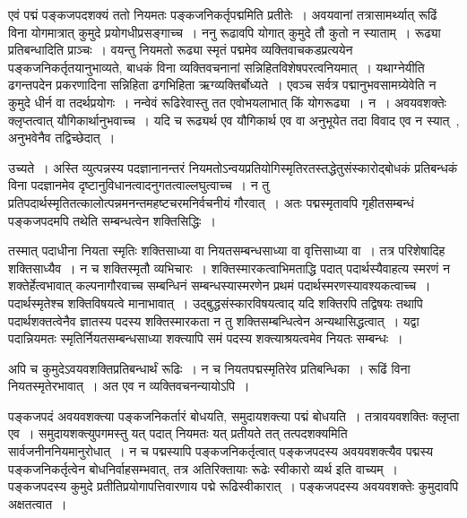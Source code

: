 			\begin{small}
			
				एवं पद्मं पङ्कजपदशक्यं ततो नियमतः पङ्कजनिकर्तृपद्ममिति प्रतीतेः~। अवयवानां तत्रासामर्थ्यात् रूढिं विना योगमात्रात् कुमुदे प्रयोगधीप्रसङ्गाच्च~। ननु रूढावपि योगात् कुमुदे तौ कुतो न स्याताम्~। रूढ्या प्रतिबन्धादिति प्राञ्चः~। वयन्तु नियमतो रूढ्या स्मृतं पद्ममेव व्यक्तिवाचकडप्रत्ययेन पङ्कजनिकर्तृतयानुभाव्यते, बाधकं विना व्यक्तिवचनानां सन्निहितविशेषपरत्वनियमात्~। यथाग्नेयीति ढगन्तपदेन प्रकरणादिना सन्निहिता ढगभिहिता ऋग्व्यक्तिर्बोध्यते~। एवञ्च सर्वत्र पद्मानुभवसामग्र्येवेति न कुमुदे धीर्न वा तदर्थप्रयोगः~। नन्वेवं रूढिरेवास्तु तत एवोभयलाभात् किं योगरूढ्या~। न~। अवयवशक्तेः क्लृप्तत्वात् यौगिकार्थानुभवाच्च~। यदि च रूढ्यर्थ एव यौगिकार्थ एव वा अनुभूयेत तदा विवाद एव न स्यात्~, अनुभवेनैव तद्विच्छेदात्~। 
				
				उच्यते~। अस्ति व्युत्पन्नस्य पदज्ञानानन्तरं नियमतोऽन्वयप्रतियोगिस्मृतिरतस्तद्धेतुसंस्कारोद्बोधकं प्रतिबन्धकं विना पदज्ञानमेव दृष्टानुविधानत्वादनुगतत्वाल्लघुत्वाच्च~। न तु प्रतिपदार्थस्मृतितत्कालोत्पन्नमनन्तमहष्टचरमनिर्वचनीयं गौरवात्~। अतः पद्मस्मृतावपि गृहीतसम्बन्धं पङ्कजपदमपि तथेति सम्बन्धत्वेन शक्तिसिद्धिः~। 
			
				तस्मात् पदाधीना नियता स्मृतिः शक्तिसाध्या वा नियतसम्बन्धसाध्या वा वृत्तिसाध्या वा~। तत्र परिशेषादिह शक्तिसाध्यैव~। न च शक्तिस्मृतौ व्यभिचारः~। शक्तिस्मारकत्वाभिमताद्धि पदात् पदार्थस्यैवाहत्य स्मरणं न शक्तेर्हेत्वभावात् कल्पनागौरवाच्च सम्बन्धिनं सम्बन्धस्यास्मरणेन प्रथमं पदार्थस्मरणस्यावश्यकत्वाच्च~। पदार्थस्मृतेश्च शक्तिविषयत्वे मानाभावात्~। उद्बुद्धसंस्कारविषयत्वाद् यदि शक्तिरपि तद्विषयः तथापि पदार्थशक्तत्वेनैव ज्ञातस्य पदस्य शक्तिस्मारकता न तु शक्तिसम्बन्धित्वेन अन्यथासिद्धत्वात्~। यद्वा पदान्नियमतः स्मृतिर्नियतसम्बन्धसाध्या शक्त्यापि समं पदस्य शक्त्याश्रयत्वमेव नियतः सम्बन्धः~। 
			
				अपि च कुमुदेऽवयवशक्तिप्रतिबन्धार्थं रूढिः~। न च नियतपद्मस्मृतिरेव प्रतिबन्धिका~। रूढिं विना नियतस्मृतेरभावात्~। अत एव न व्यक्तिवचनन्यायोऽपि~। 
			\end{small}
			
			पङ्कजपदं अवयवशक्त्या पङ्कजनिकर्तारं बोधयति, समुदायशक्त्या पद्मं बोधयति~।  तत्रावयवशक्तिः क्लृप्ता एव~। समुदायशक्त्युपगमस्तु यत् पदात् नियमतः यत् प्रतीयते तत् तत्पदशक्यमिति सार्वजनीननियमानुरोधात्~।  न च पद्मस्यापि पङ्कजनिकर्तृत्वात् पङ्कजपदस्य अवयवशक्त्यैव पद्मस्य पङ्कजनिकर्तृत्वेन बोधनिर्वाहसम्भवात्, तत्र अतिरिक्तायाः रूढेः स्वीकारो व्यर्थ इति वाच्यम्~।  पङ्कजपदस्य कुमुदे प्रतीतिप्रयोगापत्तिवारणाय पद्मे रूढिस्वीकारात्~।  पङ्कजपदस्य अवयवशक्तेः कुमुदावपि  अक्षतत्वात~। 


